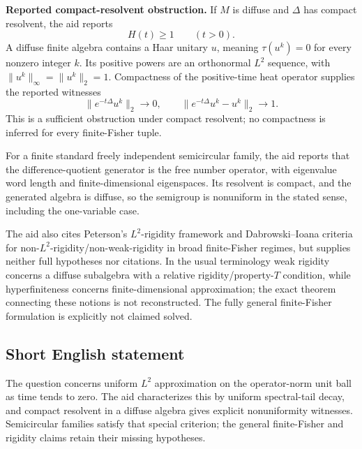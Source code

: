 \documentclass[11pt]{article}
\begin{document}
\textbf{Reported compact-resolvent obstruction.} If \(M\) is diffuse and \(\Delta\) has compact resolvent, the aid reports
\[
 H(t)\geq1\qquad(t>0).
\]
A diffuse finite algebra contains a Haar unitary \(u\), meaning \(\tau(u^k)=0\) for every nonzero integer \(k\). Its positive powers are an orthonormal \(L^2\) sequence, with \(\|u^k\|_\infty=\|u^k\|_2=1\). Compactness of the positive-time heat operator supplies the reported witnesses
\[
 \|e^{-t\Delta}u^k\|_2\to0,
 \qquad\|e^{-t\Delta}u^k-u^k\|_2\to1.
\]
This is a sufficient obstruction under compact resolvent; no compactness is inferred for every finite-Fisher tuple.

For a finite standard freely independent semicircular family, the aid reports that the difference-quotient generator is the free number operator, with eigenvalue word length and finite-dimensional eigenspaces. Its resolvent is compact, and the generated algebra is diffuse, so the semigroup is nonuniform in the stated sense, including the one-variable case.

The aid also cites Peterson's \(L^2\)-rigidity framework and Dabrowski--Ioana criteria for non-\(L^2\)-rigidity/non-weak-rigidity in broad finite-Fisher regimes, but supplies neither full hypotheses nor citations. In the usual terminology weak rigidity concerns a diffuse subalgebra with a relative rigidity/property-\(T\) condition, while hyperfiniteness concerns finite-dimensional approximation; the exact theorem connecting these notions is not reconstructed. The fully general finite-Fisher formulation is explicitly not claimed solved.
\subsection{Short English statement}
The question concerns uniform \(L^2\) approximation on the operator-norm unit ball as time tends to zero. The aid characterizes this by uniform spectral-tail decay, and compact resolvent in a diffuse algebra gives explicit nonuniformity witnesses. Semicircular families satisfy that special criterion; the general finite-Fisher and rigidity claims retain their missing hypotheses.
\end{document}
